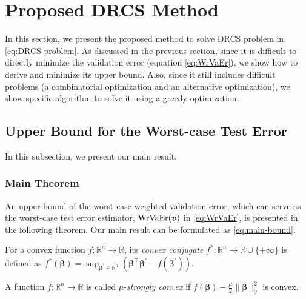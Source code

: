 \section{Proposed DRCS Method}
\label{sec:method}

%
In this section, we present the proposed method to solve DRCS problem in \eqref{eq:DRCS-problem}.
{As discussed in the previous section, since it is difficult to directly minimize the validation error (equation \ref{eq:WrVaEr}), we show how to derive and minimize its upper bound. Also, since it still includes difficult problems (a combinatorial optimization and an alternative optimization), we show specific algorithm to solve it using a greedy optimization.}

\subsection{Upper Bound for the Worst-case Test Error}
\label{subsec:UB_WC}
%
In this subsection, we present our main result.

\subsubsection{Main Theorem}
%
An upper bound of the worst-case weighted validation error, which can serve as the worst-case test error estimator, $ {\rm WrVaEr}(\bm v) $ in \eqref{eq:WrVaEr}, is presented in the following theorem. Our main result can be formulated as \eqref{eq:main-bound}.

\begin{definition}
{For a convex function $f:\mathbb{R}^n\to\mathbb{R}$, its {\em convex conjugate} $f^*:\mathbb{R}^n\to\mathbb{R}\cup\{+\infty\}$ is defined as $f^*(\bm\beta) = \sup_{\bm\beta^\prime\in\mathbb{R}^n}(\bm\beta^\top\bm\beta^\prime - f(\bm\beta^\prime))$.}
\end{definition}

\begin{definition}
A function $f:\mathbb{R}^n\to\mathbb{R}$ is called $\mu$-{\em strongly convex} if $f(\bm\beta) - \frac{\mu}{2}\|\bm\beta\|_2^2$ is convex.
\end{definition}


